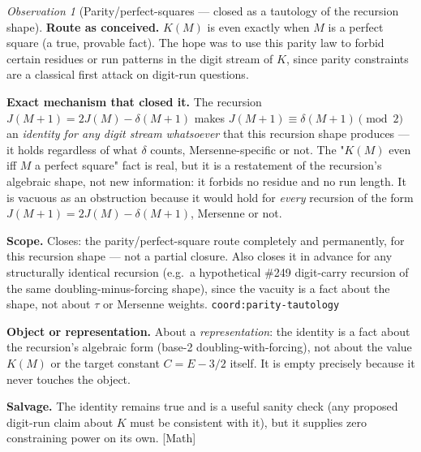 \documentclass[11pt]{article}
\theoremstyle{plain}
\theoremstyle{definition}
\theoremstyle{remark}
\newtheorem{obs}[thm]{Observation}
\newcommand{\ev}[1]{{\small\textsf{[#1]}}\xspace}
\newcommand{\coord}[1]{\texorpdfstring{{\small\nolinkurl{coord:#1}}}{coord:#1}\xspace}
\begin{document}
\begin{obs}[Parity/perfect-squares — closed as a tautology of the recursion shape]
\label{obs:parity-squares}
\textbf{Route as conceived.} $K(M)$ is even exactly when $M$ is a perfect square (a true,
provable fact). The hope was to use this parity law to forbid certain residues or run patterns in
the digit stream of $K$, since parity constraints are a classical first attack on digit-run
questions.

\textbf{Exact mechanism that closed it.} The recursion $J(M+1) = 2J(M) - \delta(M+1)$ makes
$J(M+1)\equiv\delta(M+1)\pmod 2$ an \emph{identity for any digit stream whatsoever} that this
recursion shape produces — it holds regardless of what $\delta$ counts, Mersenne-specific or not.
The "$K(M)$ even iff $M$ a perfect square" fact is real, but it is a restatement of the recursion's
algebraic shape, not new information: it forbids no residue and no run length. It is vacuous as an
obstruction because it would hold for \emph{every} recursion of the form $J(M+1)=2J(M)-\delta(M+1)$,
Mersenne or not.

\textbf{Scope.} Closes: the parity/perfect-square route completely and permanently, for this
recursion shape — not a partial closure. Also closes it in advance for any structurally identical
recursion (e.g.\ a hypothetical \#249 digit-carry recursion of the same doubling-minus-forcing
shape), since the vacuity is a fact about the shape, not about $\tau$ or Mersenne weights.
\coord{parity-tautology}

\textbf{Object or representation.} About a \emph{representation}: the identity is a fact about the
recursion's algebraic form (base-2 doubling-with-forcing), not about the value $K(M)$ or the
target constant $C=E-3/2$ itself. It is empty precisely because it never touches the object.

\textbf{Salvage.} The identity remains true and is a useful sanity check (any proposed digit-run
claim about $K$ must be consistent with it), but it supplies zero constraining power on its own.
\ev{Math}
\end{obs}
\end{document}
